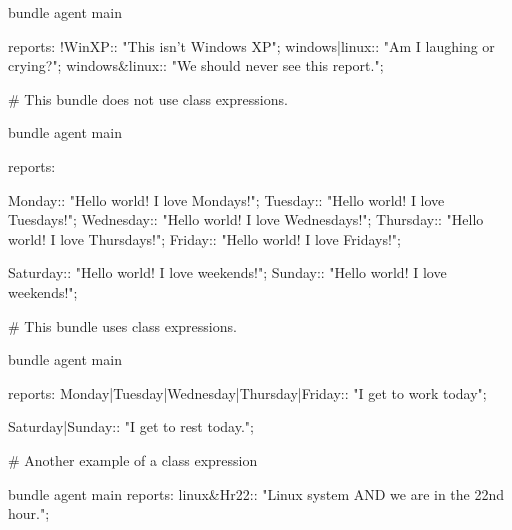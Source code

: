 \begin{codelisting}
\begin{code}
bundle agent main
{
  reports:
    !WinXP:: "This isn't Windows XP";
    windows|linux::  "Am I laughing or crying?";
    windows&linux::  "We should never see this report.";

}
\end{code}
\end{codelisting}
\begin{codelisting}
\begin{code}
# This bundle does not use class expressions.

bundle agent main
{
  reports:

    Monday::    "Hello world! I love Mondays!";
    Tuesday::   "Hello world! I love Tuesdays!";
    Wednesday:: "Hello world! I love Wednesdays!";
    Thursday::  "Hello world! I love Thursdays!";
    Friday::    "Hello world! I love Fridays!";

    Saturday::  "Hello world! I love weekends!";
    Sunday::    "Hello world! I love weekends!";
}
\end{code}
\end{codelisting}
\begin{codelisting}
\begin{code}
# This bundle uses class expressions.

bundle agent main
{
  reports:
    Monday|Tuesday|Wednesday|Thursday|Friday::
      "I get to work today";

    Saturday|Sunday::
      "I get to rest today.";
}
\end{code}
\end{codelisting}
\begin{codelisting}
\begin{code}
# Another example of a class expression

bundle agent main
{
  reports:
      linux&Hr22::
        "Linux system AND we are in the 22nd hour.";
}

\end{code}
\end{codelisting}
